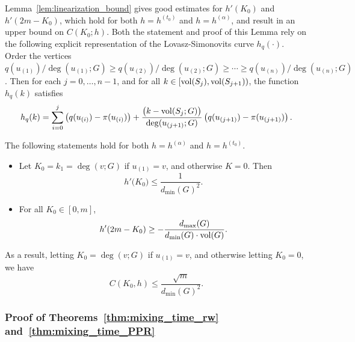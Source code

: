 Lemma~\ref{lem:linearization_bound} gives good estimates for $h'(K_0)$ and $h'(2m - K_0)$, which hold for both $h = h^{(t_0)}$ and $h = h^{(\alpha)}$, and result in an upper bound on $C(K_0;h)$. Both the statement and proof of this Lemma rely on the following explicit representation of the Lovasz-Simonovits curve $h_q(\cdot)$. Order the vertices $q(u_{(1)})/\deg(u_{(1)};G) \geq q(u_{(2)})/\deg(u_{(2)};G) \geq \cdots \geq q(u_{(n)})/\deg(u_{(n)};G)$. Then for each $j = 0,\ldots,n - 1$, and for all $k \in [\mathrm{vol}(S_j),\mathrm{vol}(S_{j + 1}))$,  the function $h_q(k)$ satisfies
\begin{equation}
\label{eqn:lovasz_simonovits}
h_q(k) = \sum_{i = 0}^{j} \left(q(u_{(i)}) - \pi(u_{(i)})\right) + \frac{\bigl(k - \mathrm{vol}(S_j;G)\bigr)}{\deg(u_{(j + 1)};G)} \left(q(u_{(j+1)}) - \pi(u_{(j+1)})\right). 
\end{equation}
\begin{lemma}
	\label{lem:linearization_bound}
	The following statements hold for both $h = h^{(\alpha)}$ and $h = h^{(t_0)}$. 
	\begin{itemize}
		\item Let $K_0 = k_1 = \deg(v;G)$ if $u_{(1)} = v$, and otherwise $K = 0$. Then  
		\begin{equation}
		\label{eqn:right_derivative_1}
		h'\bigl(K_0\bigr) \leq \frac{1}{d_{\min}(G)^2}.
		\end{equation}
		\item For all $K_0 \in [0,m]$,
		\begin{equation}
		\label{eqn:right_derivative_2}
		h'(2m - K_0) \geq -\frac{d_{\max}(G)}{d_{\min}(G)\cdot \mathrm{vol}(G)}.
		\end{equation}
	\end{itemize}
	As a result, letting $K_0 = \deg(v;G)$ if $u_{(1)} = v$, and otherwise letting $K_0 = 0$, we have
	\begin{equation*}
	C(K_0,h) \leq \frac{\sqrt{m}}{d_{\min}(G)^2}.
	\end{equation*}
\end{lemma}

\subsubsection{Proof of Theorems~\ref{thm:mixing_time_rw} and~\ref{thm:mixing_time_PPR}}

